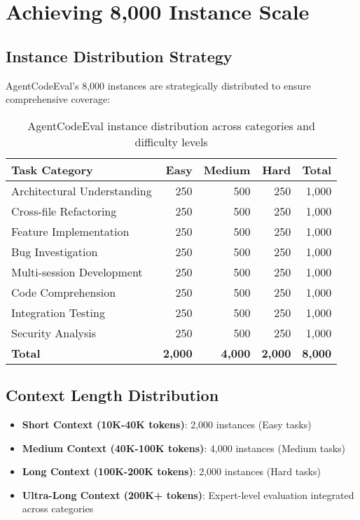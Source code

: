 \documentclass{article}
\begin{document}
\section{Achieving 8,000 Instance Scale}

\subsection{Instance Distribution Strategy}
AgentCodeEval's 8,000 instances are strategically distributed to ensure comprehensive coverage:

\begin{table}[h]
\centering
\begin{tabular}{@{}lrrrr@{}}
\toprule
Task Category & Easy & Medium & Hard & Total \\
\midrule
Architectural Understanding & 250 & 500 & 250 & 1,000 \\
Cross-file Refactoring & 250 & 500 & 250 & 1,000 \\
Feature Implementation & 250 & 500 & 250 & 1,000 \\
Bug Investigation & 250 & 500 & 250 & 1,000 \\
Multi-session Development & 250 & 500 & 250 & 1,000 \\
Code Comprehension & 250 & 500 & 250 & 1,000 \\
Integration Testing & 250 & 500 & 250 & 1,000 \\
Security Analysis & 250 & 500 & 250 & 1,000 \\
\midrule
\textbf{Total} & \textbf{2,000} & \textbf{4,000} & \textbf{2,000} & \textbf{8,000} \\
\bottomrule
\end{tabular}
\caption{AgentCodeEval instance distribution across categories and difficulty levels}
\end{table}

\subsection{Context Length Distribution}
\begin{itemize}
    \item \textbf{Short Context (10K-40K tokens)}: 2,000 instances (Easy tasks)
    \item \textbf{Medium Context (40K-100K tokens)}: 4,000 instances (Medium tasks)
    \item \textbf{Long Context (100K-200K tokens)}: 2,000 instances (Hard tasks)
    \item \textbf{Ultra-Long Context (200K+ tokens)}: Expert-level evaluation integrated across categories
\end{itemize}
\end{document}
